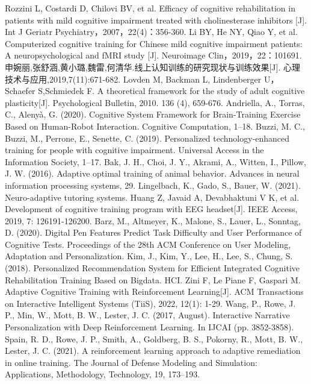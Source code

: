 \documentclass{article}
\begin{document}
    
    \begin{thebibliography}{99}  

        Rozzini L, Costardi D, Chilovi BV, et al. Efficacy of cognitive rehabilitation in patients with mild cognitive impairment treated with cholinesterase inhibitors [J]. Int J Geriatr Psychiatry，2007，22(4)：356-360.
        Li BY, He NY, Qiao Y, et al. Computerized cognitive training for Chinese mild cognitive impairment patients: A neuropsychological and fMRI study [J]. Neuroimage Clin，2019，22：101691.
        申婉丽,张舒涵,黄小璐,魏雷,何清华.线上认知训练的研究现状与训练效果[J]. 心理技术与应用,2019,7(11):671-682.
        Lovden M, Backman L, Lindenberger U，Schaefer S,Schmiedek F. A theoretical framework for the study of adult cognitive plasticity[J]. Psychological Bulletin, 2010. 136 (4), 659-676.
        Andriella, A., Torras, C.,  Alenyà, G. (2020). Cognitive System Framework for Brain-Training Exercise Based on Human-Robot Interaction. Cognitive Computation, 1–18.
        Buzzi, M. C., Buzzi, M., Perrone, E., Senette, C. (2019). Personalized technology-enhanced training for people with cognitive impairment. Universal Access in the Information Society, 1–17. 
        Bak, J. H., Choi, J. Y., Akrami, A., Witten, I.,  Pillow, J. W. (2016). Adaptive optimal training of animal behavior. Advances in neural information processing systems, 29.
        Lingelbach, K., Gado, S.,  Bauer, W. (2021). Neuro-adaptive tutoring systems. 
        Huang Z, Javaid A, Devabhaktuni V K, et al. Development of cognitive training program with EEG headset[J]. IEEE Access, 2019, 7: 126191-126200.
        Barz, M., Altmeyer, K., Malone, S., Lauer, L., Sonntag, D. (2020). Digital Pen Features Predict Task Difficulty and User Performance of Cognitive Tests. Proceedings of the 28th ACM Conference on User Modeling, Adaptation and Personalization. 
        Kim, J., Kim, Y., Lee, H., Lee, S.,  Chung, S. (2018). Personalized Recommendation System for Efficient Integrated Cognitive Rehabilitation Training Based on Bigdata. HCI.
        Zini F, Le Piane F, Gaspari M. Adaptive Cognitive Training with Reinforcement Learning[J]. ACM Transactions on Interactive Intelligent Systems (TiiS), 2022, 12(1): 1-29.
        Wang, P., Rowe, J. P., Min, W., Mott, B. W.,  Lester, J. C. (2017, August). Interactive Narrative Personalization with Deep Reinforcement Learning. In IJCAI (pp. 3852-3858).
        Spain, R. D., Rowe, J. P., Smith, A., Goldberg, B. S., Pokorny, R., Mott, B. W., Lester, J. C. (2021). A reinforcement learning approach to adaptive remediation in online training. The Journal of Defense Modeling and Simulation: Applications, Methodology, Technology, 19, 173–193. 
        \end{thebibliography}
\end{document}
